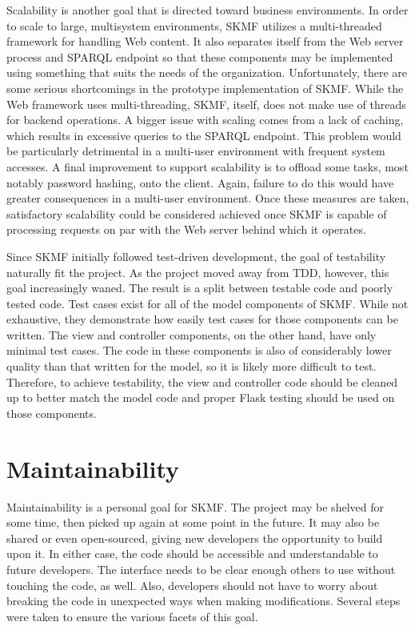 Scalability is another goal that is directed toward business environments. In order to scale to large, multisystem environments, SKMF utilizes a multi-threaded framework for handling Web content. It also separates itself from the Web server process and SPARQL endpoint so that these components may be implemented using something that suits the needs of the organization. Unfortunately, there are some serious shortcomings in the prototype implementation of SKMF. While the Web framework uses multi-threading, SKMF, itself, does not make use of threads for backend operations. A bigger issue with scaling comes from a lack of caching, which results in excessive queries to the SPARQL endpoint. This problem would be particularly detrimental in a multi-user environment with frequent system accesses. A final improvement to support scalability is to offload some tasks, most notably password hashing, onto the client. Again, failure to do this would have greater consequences in a multi-user environment. Once these measures are taken, satisfactory scalability could be considered achieved once SKMF is capable of processing requests on par with the Web server behind which it operates.

Since SKMF initially followed test-driven development, the goal of testability naturally fit the project. As the project moved away from TDD, however, this goal increasingly waned. The result is a split between testable code and poorly tested code. Test cases exist for all of the model components of SKMF. While not exhaustive, they demonstrate how easily test cases for those components can be written. The view and controller components, on the other hand, have only minimal test cases. The code in these components is also of considerably lower quality than that written for the model, so it is likely more difficult to test. Therefore, to achieve testability, the view and controller code should be cleaned up to better match the model code and proper Flask testing should be used on those components.


\section{Maintainability}
\label{result:maintain}

Maintainability is a personal goal for SKMF. The project may be shelved for some time, then picked up again at some point in the future. It may also be shared or even open-sourced, giving new developers the opportunity to build upon it. In either case, the code should be accessible and understandable to future developers. The interface needs to be clear enough others to use without touching the code, as well. Also, developers should not have to worry about breaking the code in unexpected ways when making modifications. Several steps were taken to ensure the various facets of this goal.


